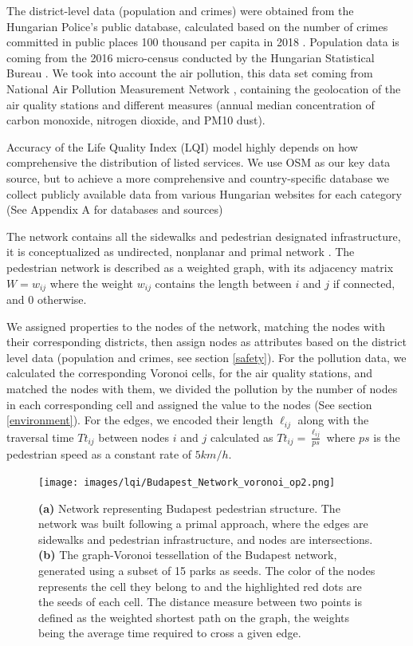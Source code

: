 The district-level data (population and crimes) were obtained from the Hungarian Police's public database, calculated based on the number of crimes committed in public places 100 thousand per capita in 2018 \cite{hun_police}. Population data is coming from the 2016 micro-census conducted by the Hungarian Statistical Bureau \cite{hun_pop}. We took into account the air pollution, this data set coming from National Air Pollution Measurement Network \cite{hun_env}, containing the geolocation of the air quality stations and different measures (annual median concentration of carbon monoxide, nitrogen dioxide, and PM10 dust).

Accuracy of the Life Quality Index (LQI) model highly depends on how comprehensive the distribution of listed services. We use OSM as our key data source, but to achieve a more comprehensive and country-specific database we collect publicly available data from various Hungarian websites for each category (See Appendix A for databases and sources)

The network contains all the sidewalks and pedestrian designated infrastructure, it is conceptualized as undirected, nonplanar and primal network \cite{Porta2006}. The pedestrian network is described as a weighted graph, with its adjacency matrix $W=w_{ij}$ where the weight $w_{ij}$ contains the length between $i$ and $j$ if connected, and $0$ otherwise.

We assigned properties to the nodes of the network, matching the nodes with their corresponding districts, then assign nodes as attributes based on the district level data (population and crimes, see section \ref{safety}). For the pollution data, we calculated the corresponding Voronoi cells, for the air quality stations, and matched the nodes with them, we divided the pollution by the number of nodes in each corresponding cell and assigned the value to the nodes (See section \ref{environment}). For the edges, we encoded their length $\ell_{ij}$ along with the traversal time $Tt_{ij}$ between nodes $i$ and $j$ calculated as $Tt_{ij}=\frac{\ell_{ij}}{ps}$ where $ps$ is the pedestrian speed as a constant rate of $5km/h$.
\begin{figure}[htbp]
	\centering
	\texttt{[image: images/lqi/Budapest\_Network\_voronoi\_op2.png]}
	\caption{\textbf{(a)} Network representing Budapest pedestrian structure. The network was built following a primal approach, where the edges are sidewalks and pedestrian infrastructure, and nodes are intersections. \textbf{(b)} The graph-Voronoi tessellation of the Budapest network, generated using a subset of 15 parks as seeds. The color of the nodes represents the cell they belong to and the highlighted red dots are the seeds of each cell. The distance measure between two points is defined as the weighted shortest path on the graph, the weights being the average time required to cross a given edge.}
	\label{fig:BPnetwork}
\end{figure}

